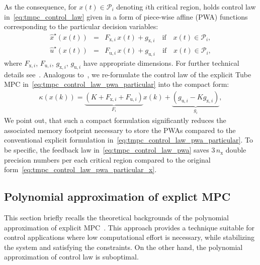 \documentclass[letterpaper, 10 pt, conference]{ieeeconf}
\begin{document}
As the consequence, for $x(t) \in \mathcal{P}_{i}$ denoting $i$th critical region, holds control law in~\eqref{eq:tmpc_control_law} given in a form of
piece-wise affine (PWA) functions corresponding to the particular decision variables:
\begin{subequations}
	\label{eq:tmpc_control_law_pwa_particular}
	\begin{eqnarray}
		\label{eq:tmpc_control_law_pwa_particular_x}
		\hat{x}^{\star}(x(t)) \!\!\!\!&=&\!\!\!\! F_{\mathrm{x},i} \, x(t) + g_{\mathrm{x},i} \quad \text{if} \quad x(t) \in \mathcal{P}_{i}, \\
		\label{eq:tmpc_control_law_pwa_particular_u}
		\hat{u}^{\star}(x(t)) \!\!\!\!&=&\!\!\!\! F_{\mathrm{u},i} \, x(t) + g_{\mathrm{u},i} \quad \text{if} \quad x(t) \in \mathcal{P}_{i},
	\end{eqnarray}
\end{subequations}
where $F_{\mathrm{x},i}$, $F_{\mathrm{u},i}$, $g_{\mathrm{x},i}$, $g_{\mathrm{u},i}$ have appropriate dimensions. For further technical details see~\cite{BM02}. 
Analogous to~\cite{ZT14}, we re-formulate the control law of the explicit Tube MPC in~\eqref{eq:tmpc_control_law_pwa_particular} into the compact form:
\begin{eqnarray}
	\label{eq:tmpc_control_law_pwa}
	\kappa(x(k)) = \underbrace{ \left( K + F_{\mathrm{x},i} + F_{\mathrm{u},i} \right) }_{ F_{i} } x(k) + \underbrace{ \left( g_{\mathrm{u},i} - K g_{\mathrm{x},i} \right) }_{ g_{i} } ,
\end{eqnarray}
We point out, that such a compact formulation significantly reduces the associated memory footprint necessary to store the PWAs compared to the conventional explicit formulation in~\eqref{eq:tmpc_control_law_pwa_particular}.  
%
To be specific, the feedback law in~\eqref{eq:tmpc_control_law_pwa} saves $3\,n_\text{x}$ double precision numbers per each critical region compared to the original form~\eqref{eq:tmpc_control_law_pwa_particular_x}.
%

\subsection{Polynomial approximation of explict MPC}
\label{sec:polynomial}
This section briefly recalls the theoretical backgrounds of the polynomial approximation of explicit MPC~\cite{kvasnica_polynomial}. This approach provides a technique suitable for control applications where low computational effort is necessary, while stabilizing the system and satisfying the constraints. On the other hand, the polynomial approximation of control law is suboptimal. 
\end{document}
